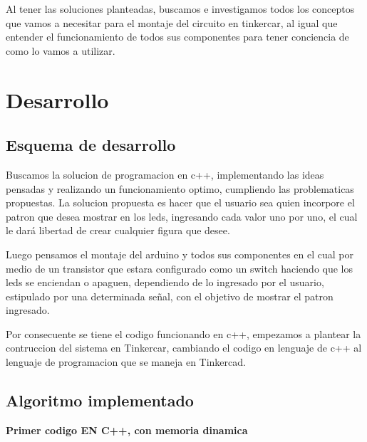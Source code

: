\documentclass{article}
\begin{document}
Al tener las soluciones planteadas, buscamos e investigamos todos los conceptos que vamos a necesitar para el montaje del circuito en tinkercar, al igual que entender el funcionamiento de todos sus componentes para tener conciencia de como lo vamos a utilizar.






\vspace{14cm}

\section{Desarrollo} \label{contenido}
\subsection{Esquema de desarrollo}

Buscamos la solucion de programacion en c++, implementando las ideas pensadas y realizando un funcionamiento optimo, cumpliendo las problematicas propuestas.
 \vspace{1cm}
La solucion propuesta es hacer que el usuario sea quien incorpore el patron que desea mostrar en los leds, ingresando cada valor uno por uno, el cual le dará libertad de crear cualquier figura que desee.


 \vspace{1cm}


Luego pensamos el montaje del arduino y todos sus componentes en el cual por medio de un transistor que estara configurado como un switch haciendo que los leds se enciendan o apaguen, dependiendo de lo ingresado por el usuario, estipulado por una determinada señal, con el objetivo de mostrar el patron ingresado.

 \vspace{1cm}
 
Por consecuente se tiene el codigo funcionando en c++, empezamos a plantear la contruccion del sistema en Tinkercar, cambiando el codigo en lenguaje de c++ al lenguaje de programacion que se maneja en Tinkercad.


\vspace{8cm}

\subsection{Algoritmo implementado}

\textbf{Primer codigo EN C++, con memoria dinamica} 
\end{document}
